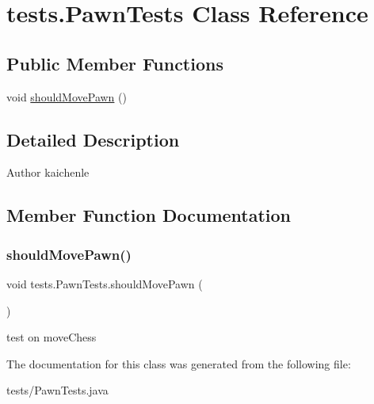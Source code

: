 \hypertarget{classtests_1_1_pawn_tests}{}\section{tests.\+Pawn\+Tests Class Reference}
\label{classtests_1_1_pawn_tests}
\subsection*{Public Member Functions}
\begin{DoxyCompactItemize}
\item 
void \mbox{\hyperlink{classtests_1_1_pawn_tests_aec235d730a400fc8ad186a7ee14680fd}{should\+Move\+Pawn}} ()
\end{DoxyCompactItemize}


\subsection{Detailed Description}
\begin{DoxyAuthor}{Author}
kaichenle 
\end{DoxyAuthor}


\subsection{Member Function Documentation}
\mbox{\label{classtests_1_1_pawn_tests_aec235d730a400fc8ad186a7ee14680fd}} 
\subsubsection{\texorpdfstring{should\+Move\+Pawn()}{shouldMovePawn()}}
{\footnotesize\ttfamily void tests.\+Pawn\+Tests.\+should\+Move\+Pawn (\begin{DoxyParamCaption}{ }\end{DoxyParamCaption})\hspace{0.3cm}{\ttfamily [inline]}}

test on move\+Chess 

The documentation for this class was generated from the following file\+:\begin{DoxyCompactItemize}
\item 
tests/Pawn\+Tests.\+java\end{DoxyCompactItemize}
